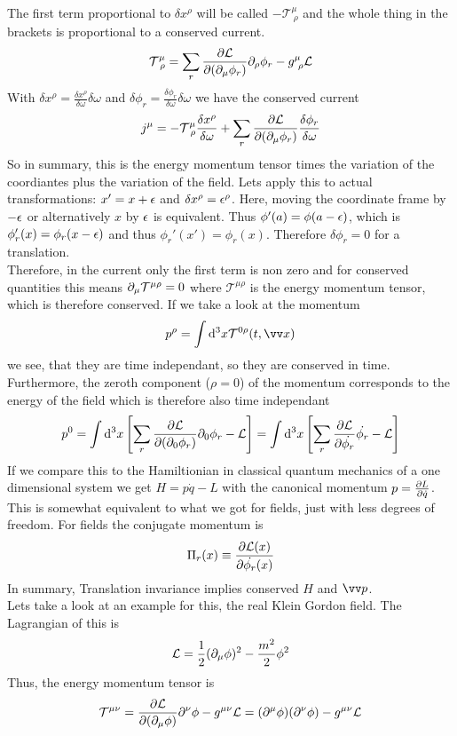 The first term proportional to $\delta x^\rho$ will be called $- \mathcal{T}^\mu_{~\rho}$ and the whole thing in the brackets is proportional to a conserved current.
\[\mathcal{T}^\mu_{~\rho} = \sum_r \frac{\partial \mathcal{L}}{\partial ( \partial_\mu \phi_r)} \partial_\rho \phi_r - g^\mu_{~\rho} \mathcal{L}\]
With $\delta x^\rho = \frac{\delta x^\rho}{\delta \omega}\delta\omega$ and $\delta \phi_r = \frac{\delta \phi_r}{\delta \omega}{\delta \omega}$ we have the conserved current
\[j ^\mu = - \mathcal{T}^\mu_{~\rho} \frac{\delta x^\rho}{\delta \omega} + \sum_r \frac{\partial \mathcal{L}}{\partial ( \partial_\mu \phi_r)} \frac{\delta \phi_r}{\delta \omega}\]
So in summary, this is the energy momentum tensor times the variation of the coordiantes plus the variation of the field. Lets apply this to actual transformations:
$x' = x + \epsilon$ and $\delta x^\rho = \epsilon ^\rho$. Here, moving the coordinate frame by $- \epsilon$ or alternatively $x$ by $\epsilon$ is equivalent. Thus $ \phi'(a) = \phi(a - \epsilon)$, which is $\phi'_r(x) = \phi_r(x - \epsilon)$ and thus $\phi_r'(x') = \phi_r(x)$. Therefore $\delta \phi_r = 0$ for a translation.\\
Therefore, in the current only the first term is non zero and for conserved quantities this means $\partial_\mu \mathcal{T}^{\mu\rho} = 0$ where $\mathcal{T}^{\mu\rho}$ is the energy momentum tensor, which is therefore conserved. If we take a look at the momentum
\[ p ^\rho = \int \dd^3 x \mathcal{T}^{0\rho}(t, \vx)\]
we see, that they are time independant, so they are conserved in time. Furthermore, the zeroth component ($\rho = 0$) of the momentum corresponds to the energy of the field which is therefore also time independant
\[p^0 = \int {\rm d}^3 x \left[ \sum_r \frac{ \partial \mathcal{L}}{\partial ( \partial_0 \phi_r)} \partial_0 \phi_r- \mathcal{L}\right] = \int {\rm d} ^3 x \left[ \sum_r \frac{\partial \mathcal{L}}{\partial \dot{\phi_r}} \dot{\phi_r}-\mathcal{L}\right]\]
If we compare this to the Hamiltionian in classical quantum mechanics of a one dimensional system we get $H = p \dot{q} - L$ with the canonical momentum $p = \frac{\partial L}{\partial \dot{q}}$. This is somewhat equivalent to what we got for fields, just with less degrees of freedom. For fields the conjugate momentum is
\[ \Pi_r(x) \equiv \frac{\partial \mathcal{L}(x)}{\partial \dot{\phi_r}(x)}\]
In summary, Translation invariance implies conserved $H$ and $\vp$.
\\Lets take a look at an example for this, the real Klein Gordon field. The Lagrangian of this is 
\[\mathcal{L} = \frac{1}{2} ( \partial_\mu \phi)^2 - \frac{m^2}{2}\phi^2\]
Thus, the energy momentum tensor is
\[ \mathcal{T}^{\mu\nu} = \frac{\partial\mathcal{L}}{\partial (\partial_\mu \phi)} \partial^\nu \phi - g^{\mu\nu} \mathcal{L} = (\partial ^\mu \phi)(\partial^\nu \phi) - g^{\mu\nu} \mathcal{L}\]
